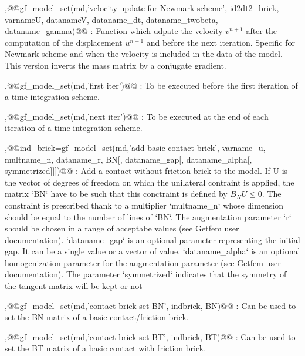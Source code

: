 \begin{cmddescription}
\sep{@@gf_model_set(md,'velocity update for Newmark scheme',  \tint id2dt2_brick, \tstr varnameU,  \tstr datanameV, \tstr dataname_dt, \tstr dataname_twobeta,  \tstr dataname_gamma)@@} :
Function which udpate the velocity $v^{n+1}$ after the computation
of the displacement $u^{n+1}$ and before the next iteration. Specific
for Newmark scheme and when the velocity is included in the data
of the model. This version inverts the mass matrix by a conjugate
gradient.

\sep{@@gf_model_set(md,'first iter')@@} :
To be executed before the first iteration of a time integration scheme.

\sep{@@gf_model_set(md,'next iter')@@} :
To be executed at the end of each iteration of a time integration scheme.

\sep{@@ind_brick=gf_model_set(md,'add basic contact brick', \tstr varname_u, \tstr multname_n, \tstr dataname_r, \tmat BN[, \tstr dataname_gap[, \tstr dataname_alpha[, \tint symmetrized]]])@@} :
Add a contact without friction brick to the model. If U is the vector
of degrees of freedom on which the unilateral contraint is applied,
the matrix `BN` have to be such that this conctraint is defined by
$B_N U \le 0$. The constraint is prescribed thank to a multiplier
`multname_n` whose dimension should be equal to the number of lines of
`BN`. The augmentation parameter `r` should be chosen in a range of
acceptabe values (see Getfem user documentation). `dataname_gap` is an
optional parameter representing the initial gap. It can be a single value
or a vector of value. `dataname_alpha` is an optional homogenization
parameter for the augmentation parameter
(see Getfem user documentation). The parameter `symmetrized` indicates
that the symmetry of the tangent matrix will be kept or not

\sep{@@gf_model_set(md,'contact brick set BN', \tint indbrick, \tmat BN)@@} :
Can be used to set the BN matrix of a basic contact/friction brick.

\sep{@@gf_model_set(md,'contact brick set BT', \tint indbrick, \tmat BT)@@} :
Can be used to set the BT matrix of a basic contact with friction brick.


\end{cmddescription}
